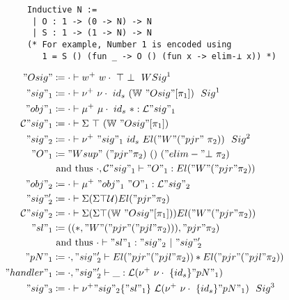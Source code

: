 \begin{figure}
  \begin{minipage}{\linewidth}
    \begin{verbatim}
      Inductive N :=
       | O : 1 -> (0 -> N) -> N 
       | S : 1 -> (1 -> N) -> N
      (* For example, Number 1 is encoded using
         1 = S () (fun _ -> O () (fun x -> elim-⊥ x)) *)
    \end{verbatim}
  \end{minipage}

  \begin{minipage}[t]{0.4\linewidth}
  \small
\begin{align*}
  "Osig" &\coloneqq \goodWSig{\cdot}{w^+\ w\cdot\ \top\ \bot}{1} \\
  "sig"_1 &\coloneqq \goodSig{\cdot}{\nu^+ \ \nu\cdot \ {id_s} \ (\bW \ "Osig"[\pi_1])}{1}  \\
  "obj"_1 &\coloneqq \goodTerm{\cdot}{\mu^+ \ \mu\cdot \ {id_s} \ *}{\cL"sig"_1}\\
  \cC"sig"_1 &\coloneqq \goodType{\cdot}{\Sigma \ \top \ (\bW \ "Osig"[\pi_1]) }{} \\
  "sig"_2 &\coloneqq  \goodSig{\cdot}{\nu^+ \ "sig"_1 \ {id_s} \ El ("W" ("pjr" \ \pi_2))}{2} \\ 
  "O"_1 &\coloneqq {"Wsup" \ ("pjr" \pi_2) \ () \ ("elim-"\bot \ \pi_2)}  \\ 
  & \text{ and thus }  \goodTerm{\cdot, \cC"sig"_1}{"O"_1}{El ("W" ("pjr" \pi_2))} \\
  "obj"_2 &\coloneqq \goodTerm{\cdot}{\mu^+ \ "obj"_1 \ "O"_1}{\cL"sig"_2} \\
  "sig"_2' &\coloneqq \goodType{\cdot}{\Sigma (\Sigma \top \cU)El ("pjr" \pi_2)}{} \\ 
  \cC"sig"_2 &\coloneqq \goodType{\cdot}{\Sigma (\Sigma \top (\bW \ "Osig"[\pi_1]))El ("W"("pjr" \pi_2)) }{} \\ 
  "sl"_1 &\coloneqq ((*, "W" ("pjr" ("pjl" \pi_2)) ), "pjr" \pi_2) \\ 
  & \text{ and thus }  \goodSeal{\cdot}{"sl"_1}{"sig"_2}{"sig"_2'} \\
  "pN"_1 &\coloneqq \goodType{\cdot, "sig"_2'}{El ("pjr" ("pjl" \pi_2)) * El ("pjr" ("pjl" \pi_2))}{} \\
  "handler"_1 &\coloneqq \goodTerm{\cdot, "sig"_2'}{\_}{\cL(\nu^+ \ \nu\cdot \ \{id_s\} "pN"_1)} \\
  "sig"_3 &\coloneqq \goodSig{\cdot}{\nu^+ "sig"_2 \{"sl"_1\} \ \cL(\nu^+ \ \nu\cdot \ \{id_s\} "pN"_1)}{3} \\ 

\end{align*}
\end{minipage}
\end{figure}
